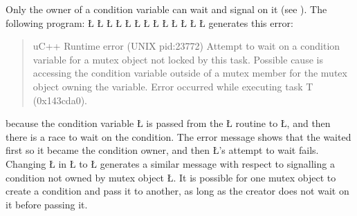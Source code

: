 \documentclass[openright,twoside]{report}
\begin{document}
Only the owner of a condition variable can wait and signal on it (see ).
The following program:
\LGinlinefalse\LGbegin\lgrinde
\L{}
\L{\LB{}}
\L{\LB{}}
\L{\LB{}}
\L{\LB{}}
\L{}
\L{\LB{}}
\L{\LB{\};}}
\endlgrinde\LGend
\LGinlinefalse\LGbegin\lgrinde
\L{}
\L{\LB{}}
\L{\LB{}}
\L{\LB{}}
\L{\LB{\}}}
\endlgrinde\LGend
generates this error:
\begin{quote}
\BGfont
uC++ Runtime error (UNIX pid:23772) Attempt to wait on a condition variable for a mutex object not locked by this task.
Possible cause is accessing the condition variable outside of a mutex member for the mutex object owning the variable.
Error occurred while executing task T (0x143cda0).
\end{quote}
because the condition variable \LGinlinetrue\LGbegin\lgrinde\L{}\endlgrinde\LGend{} is passed from the \LGinlinetrue\LGbegin\lgrinde\L{}\endlgrinde\LGend{} routine to \LGinlinetrue\LGbegin\lgrinde\L{}\endlgrinde\LGend{}, and then there is a race to wait on the condition.
The error message shows that the  waited first so it became the condition owner, and then \LGinlinetrue\LGbegin\lgrinde\L{}\endlgrinde\LGend{}'s attempt to wait fails. 
Changing \LGinlinetrue\LGbegin\lgrinde\L{}\endlgrinde\LGend{} in \LGinlinetrue\LGbegin\lgrinde\L{}\endlgrinde\LGend{} to \LGinlinetrue\LGbegin\lgrinde\L{}\endlgrinde\LGend{} generates a similar message with respect to signalling a condition not owned by mutex object \LGinlinetrue\LGbegin\lgrinde\L{}\endlgrinde\LGend{}.
It is possible for one mutex object to create a condition and pass it to another, as long as the creator does not wait on it before passing it.
\end{document}
